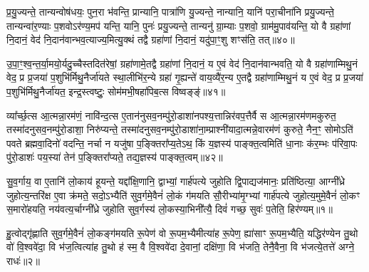 प्र॒यु॒ज्यन्ते॒ तान्यन्वोष॑धयः॒ पुन॒रा भ॑वन्ति॒ प्रान्यानि॒ पात्रा॑णि यु॒ज्यन्ते॒ नान्यानि॒ यानि॑ परा॒चीना॑नि प्रयु॒ज्यन्ते॒ तान्यन्वा॑र॒ण्याः प॒शवो\-ऽर॑ण्य॒मप॑ यन्ति॒ यानि॒ पुनः॑ प्रयु॒ज्यन्ते॒ तान्यनु॑ ग्रा॒म्याः प॒शवो॒ ग्राम॑मु॒पाव॑यन्ति॒ यो वै ग्रहा॑णां नि॒दानं॒ वेद॑ नि॒दान॑वान्भव॒त्याज्य॒मित्यु॒क्थं तद्वै ग्रहा॑णां नि॒दानं॒ यदु॑पा॒ꣳ॒शु शꣳस॑ति॒ तत्॥४०॥

उ॒पा॒ꣳ॒श्व॒न्त॒र्या॒मयो॒र्यदु॒च्चैस्तदित॑रेषां॒ ग्रहा॑णामे॒तद्वै ग्रहा॑णां नि॒दानं॒ य ए॒वं वेद॑ नि॒दान॑वान्भवति॒ यो वै ग्रहा॑णाम्मिथु॒नं वेद॒ प्र प्र॒जया॑ प॒शुभि॑र्मिथु॒नैर्जा॑यते स्था॒लीभि॑र॒न्ये ग्रहा॑ गृ॒ह्यन्ते॑ वाय॒व्यै॑र॒न्य ए॒तद्वै ग्रहा॑णाम्मिथु॒नं य ए॒वं वेद॒ प्र प्र॒जया॑ प॒शुभि॑र्मिथु॒नैर्जा॑यत॒ इन्द्र॒स्त्वष्टुः॒ सोम॑मभी॒षहा॑पिब॒त्स विष्वङ्ङ्॑॥४१॥

व्या᳚र्च्छ॒त्स आ॒त्मन्ना॒रम॑णं॒ नावि॑न्द॒त्स ए॒तान॑नुसव॒नम्पु॑रो॒डाशा॑नपश्य॒त्तान्निर॑वप॒त्तैर्वै स आ॒त्मन्ना॒रम॑णमकुरुत॒ तस्मा॑दनुसव॒नम्पु॑रो॒डाशा॒ निरु॑प्यन्ते॒ तस्मा॑दनुसव॒नम्पु॑रो॒डाशा॑ना॒म्प्राश्नी॑यादा॒त्मन्ने॒वारम॑णं कुरुते॒ नैन॒ꣳ॒ सोमो\-ऽति॑ पवते ब्रह्मवा॒दिनो॑ वदन्ति॒ नर्चा न यजु॑षा प॒ङ्क्तिरा᳚प्य॒ते\-ऽथ॒ किं य॒ज्ञस्य॑ पाङ्क्त॒त्वमिति॑ धा॒नाः क॑र॒म्भः प॑रिवा॒पः पु॑रो॒डाशः॑ पय॒स्या॑ तेन॑ प॒ङ्क्तिरा᳚प्यते॒ तद्य॒ज्ञस्य॑ पाङ्क्त॒त्वम्॥४२॥

{\anuvakamend[{भ॒व॒न्ति॒ यानि॒ पुनः॒ शꣳस॑ति॒ तद्विष्व॒ङ्किञ्चतु॑र्दश च॥11॥}]}


{}

\setcounter{anuvakam}{0}
सु॒व॒र्गाय॒ वा ए॒तानि॑ लो॒काय॑ हूयन्ते॒ यद्दा᳚क्षि॒णानि॒ द्वाभ्यां॒ गार्\mbox{}ह॑पत्ये जुहोति द्वि॒पाद्यज॑मानः॒ प्रति॑ष्ठित्या॒ आग्नी᳚ध्रे जुहोत्य॒न्तरि॑क्ष ए॒वा क्र॑मते॒ सदो॒\-ऽभ्यैति॑ सुव॒र्गमे॒वैनं॑ लो॒कं ग॑मयति सौ॒रीभ्या॑मृ॒ग्भ्यां गार्\mbox{}ह॑पत्ये जुहोत्य॒मुमे॒वैनं॑ लो॒कꣳ स॒मारो॑हयति॒ नय॑वत्य॒र्चाग्नी᳚ध्रे जुहोति सुव॒र्गस्य॑ लो॒कस्या॒भिनी᳚त्यै॒ दिवं॑ गच्छ॒ सुवः॑ प॒तेति॒ हिर॑ण्यम्॥१॥

हु॒त्वोद्गृ॑ह्णाति सुव॒र्गमे॒वैनं॑ लो॒कङ्ग॑मयति रू॒पेण॑ वो रू॒पम॒भ्यैमीत्या॑ह रू॒पेण॒ ह्या॑साꣳ रू॒पम॒भ्यैति॒ यद्धिर॑ण्येन तु॒थो वो॑ वि॒श्ववे॑दा॒ वि भ॑ज॒त्वित्या॑ह तु॒थो ह॑ स्म॒ वै वि॒श्ववे॑दा दे॒वानां॒ दक्षि॑णा॒ वि भ॑जति॒ तेनै॒वैना॒ वि भ॑जत्ये॒तत्ते॑ अग्ने॒ राधः॑॥२॥

